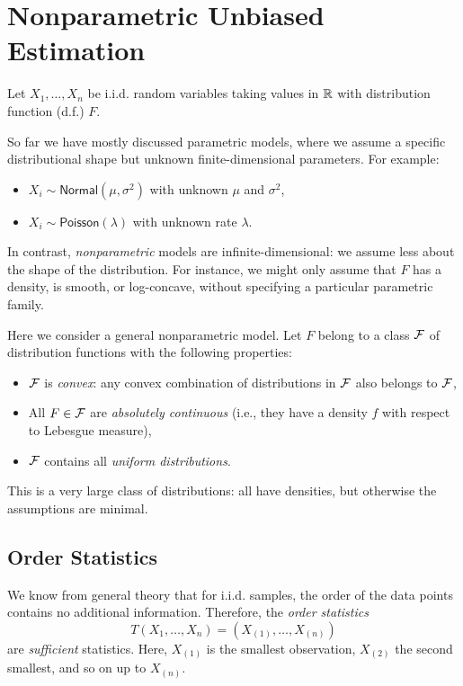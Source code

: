 \section{Nonparametric Unbiased Estimation}%
\label{sec:nue}

Let \(X_{1}, \dots, X_{n}\) be i.i.d. random variables taking values in \(\mathbb{R}\) with distribution function (d.f.) \(F\).

So far we have mostly discussed parametric models, where we assume a specific distributional shape but unknown finite-dimensional parameters. For example:

\begin{itemize}
    \item \(X_i \sim \mathsf{Normal}(\mu, \sigma^2)\) with unknown \(\mu\) and \(\sigma^2\),
    \item \(X_i \sim \mathsf{Poisson}(\lambda)\) with unknown rate \(\lambda\).
\end{itemize}

In contrast, \emph{nonparametric} models are infinite-dimensional: we assume less about the shape of the distribution. For instance, we might only assume that \(F\) has a density, is smooth, or log-concave, without specifying a particular parametric family.

Here we consider a general nonparametric model. Let \(F\) belong to a class \(\mathcal{F}\) of distribution functions with the following properties:

\begin{itemize}
    \item \(\mathcal{F}\) is \emph{convex}: any convex combination of distributions in \(\mathcal{F}\) also belongs to \(\mathcal{F}\),
    \item All \(F \in \mathcal{F}\) are \emph{absolutely continuous} (i.e., they have a density \(f\) with respect to Lebesgue measure),
    \item \(\mathcal{F}\) contains all \emph{uniform distributions}.
\end{itemize}

This is a very large class of distributions: all have densities, but otherwise the assumptions are minimal. 

\subsection*{Order Statistics}
We know from general theory that for i.i.d. samples, the order of the data points contains no additional information. Therefore, the \emph{order statistics} 
\[
T(X_1, \dots, X_n) = (X_{(1)}, \dots, X_{(n)})
\] 
are \emph{sufficient} statistics. Here, \(X_{(1)}\) is the smallest observation, \(X_{(2)}\) the second smallest, and so on up to \(X_{(n)}\).

